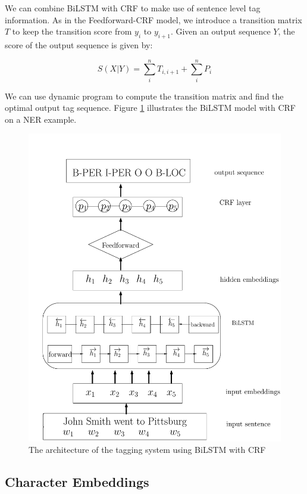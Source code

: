  We can combine BiLSTM with CRF to make use of sentence level tag information. As in the Feedforward-CRF model, we introduce a transition matrix $T$ to keep the transition score from $y_{i}$ to $y_{i+1}$. Given an output sequence $Y$, the score of the output sequence is given by:

\begin{equation}
S\left( X|Y\right)=\sum _{i}^{n}T_{i,i+1}+\sum _{i}^{n}P_{i}
\end{equation}

We can use dynamic program to compute the transition matrix and find the optimal output tag sequence. Figure \ref{fig:bilstmcrf} illustrates the BiLSTM model with CRF on a NER example.

\begin{figure}
  \centering
  \includegraphics[scale=0.6]{bilstmcrf.pdf}
 \caption{The architecture of the tagging system using BiLSTM with CRF}
  \label{fig:bilstmcrf}
\end{figure}

\subsection{Character Embeddings}

